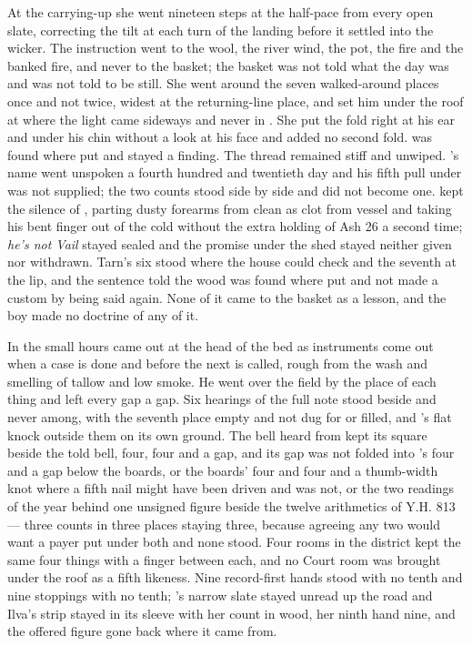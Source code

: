 At the carrying-up she went nineteen steps at the half-pace from every open slate, correcting the tilt at each turn of the landing before it settled into the wicker. The instruction went to the wool, the river wind, the pot, the fire and the banked fire, and never to the basket; the basket was not told what the day was and was not told to be still. She went around the seven walked-around places once and not twice, widest at the returning-line place, and set him under the roof at  where the light came sideways and never in . She put the fold right at his ear and under his chin without a look at his face and added no second fold.  was found where put and stayed a finding. The thread remained stiff and unwiped. 's name went unspoken a fourth hundred and twentieth day and his fifth pull under  was not supplied; the two counts stood side by side and did not become one.  kept the silence of , parting dusty forearms from clean as clot from vessel and taking his bent finger out of the cold  without the extra holding of Ash 26 a second time; \emph{he's not Vail} stayed sealed and the promise under the shed stayed neither given nor withdrawn. Tarn's six stood where the house could check and the seventh at the lip, and the sentence told the wood was found where put and not made a custom by being said again. None of it came to the basket as a lesson, and the boy made no doctrine of any of it.

\scenebreak

In the small hours  came out at the head of the bed as instruments come out when a case is done and before the next is called, rough from the wash and smelling of tallow and low smoke. He went over the field by the place of each thing and left every gap a gap. Six hearings of the full note stood beside and never among, with the seventh place empty and not dug for or filled, and 's flat knock outside them on its own ground. The bell heard from  kept its square beside the told bell, four, four and a gap, and its gap was not folded into 's four and a gap below the boards, or the boards' four and four and a thumb-width knot where a fifth nail might have been driven and was not, or the two readings of the year behind one unsigned figure beside the twelve arithmetics of Y.H. 813 --- three counts in three places staying three, because agreeing any two would want a payer put under both and none stood. Four rooms in the district kept the same four things with a finger between each, and no Court room was brought under the roof as a fifth likeness. Nine record-first hands stood with no tenth and nine stoppings with no tenth; 's narrow slate stayed unread up the road and Ilva's strip stayed in its sleeve with her count in wood, her ninth hand nine, and the offered figure gone back where it came from.

